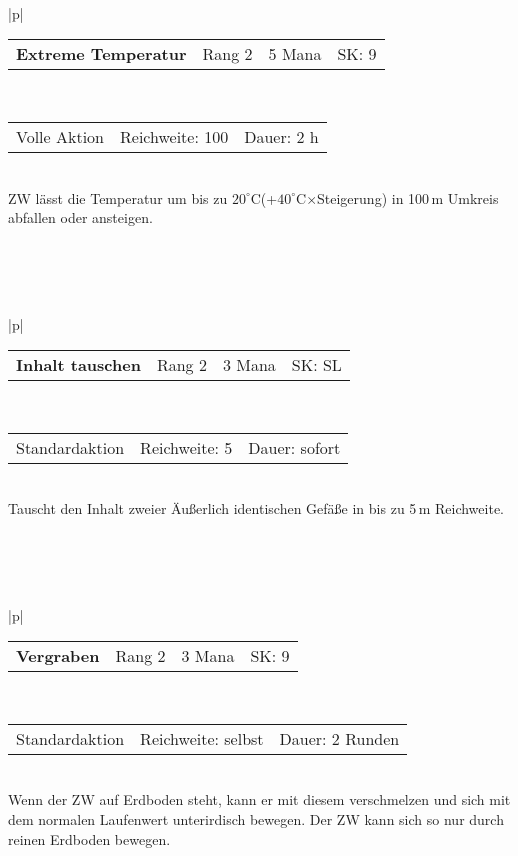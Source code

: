 \documentclass[../../Heldenanleitung2]{subfiles}
\begin{document}
\\\\\\
\begin{tabular}{|p{\textwidth}|}
\hline
\begin{tabularx}{\textwidth}{X|X|X|X}
\textbf{Extreme Temperatur} & Rang 2 & 5 Mana & SK: 9
\end{tabularx} \\ \hline
\begin{tabularx}{\textwidth}{X|X|X}
Volle Aktion & Reichweite: 100 & Dauer: 2 h
\end{tabularx} \\ \hline
ZW lässt die Temperatur um bis zu $20^\circ$C(+$40^\circ$C$\times$Steigerung) in 100\,m Umkreis abfallen oder ansteigen.
\\ \hline
\end{tabular}
\\\\\\
\begin{tabular}{|p{\textwidth}|}
\hline
\begin{tabularx}{\textwidth}{X|X|X|X}
\textbf{Inhalt tauschen} & Rang 2 & 3 Mana  & SK: SL
\end{tabularx} \\ \hline
\begin{tabularx}{\textwidth}{X|X|X}
Standardaktion & Reichweite: 5 & Dauer: sofort
\end{tabularx} \\ \hline
Tauscht den Inhalt zweier Äußerlich identischen Gefäße in bis zu 5\,m Reichweite. 
\\ \hline
\end{tabular}
\\\\\\
\begin{tabular}{|p{\textwidth}|}
\hline
\begin{tabularx}{\textwidth}{X|X|X|X}
\textbf{Vergraben} & Rang 2 & 3 Mana & SK: 9
\end{tabularx} \\ \hline
\begin{tabularx}{\textwidth}{X|X|X}
Standardaktion & Reichweite: selbst & Dauer: 2 Runden
\end{tabularx} \\ \hline
Wenn der ZW auf Erdboden steht, kann er mit diesem verschmelzen und sich mit dem normalen Laufenwert unterirdisch bewegen. Der ZW kann sich so nur durch reinen Erdboden bewegen.
\\ \hline
\end{tabular}
\end{document}
